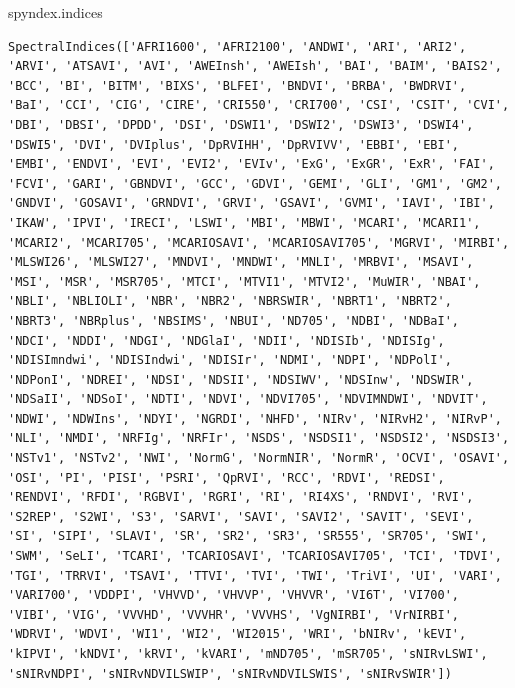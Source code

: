 \documentclass[
]{article}
\newenvironment{Shaded}{}{}
\newcommand{\NormalTok}[1]{#1}
\begin{document}
\label{58bacb5c}
\label{cb5}
\begin{Shaded}
\begin{Highlighting}[]
\NormalTok{spyndex.indices}
\end{Highlighting}
\end{Shaded}

\begin{verbatim}
SpectralIndices(['AFRI1600', 'AFRI2100', 'ANDWI', 'ARI', 'ARI2', 'ARVI', 'ATSAVI', 'AVI', 'AWEInsh', 'AWEIsh', 'BAI', 'BAIM', 'BAIS2', 'BCC', 'BI', 'BITM', 'BIXS', 'BLFEI', 'BNDVI', 'BRBA', 'BWDRVI', 'BaI', 'CCI', 'CIG', 'CIRE', 'CRI550', 'CRI700', 'CSI', 'CSIT', 'CVI', 'DBI', 'DBSI', 'DPDD', 'DSI', 'DSWI1', 'DSWI2', 'DSWI3', 'DSWI4', 'DSWI5', 'DVI', 'DVIplus', 'DpRVIHH', 'DpRVIVV', 'EBBI', 'EBI', 'EMBI', 'ENDVI', 'EVI', 'EVI2', 'EVIv', 'ExG', 'ExGR', 'ExR', 'FAI', 'FCVI', 'GARI', 'GBNDVI', 'GCC', 'GDVI', 'GEMI', 'GLI', 'GM1', 'GM2', 'GNDVI', 'GOSAVI', 'GRNDVI', 'GRVI', 'GSAVI', 'GVMI', 'IAVI', 'IBI', 'IKAW', 'IPVI', 'IRECI', 'LSWI', 'MBI', 'MBWI', 'MCARI', 'MCARI1', 'MCARI2', 'MCARI705', 'MCARIOSAVI', 'MCARIOSAVI705', 'MGRVI', 'MIRBI', 'MLSWI26', 'MLSWI27', 'MNDVI', 'MNDWI', 'MNLI', 'MRBVI', 'MSAVI', 'MSI', 'MSR', 'MSR705', 'MTCI', 'MTVI1', 'MTVI2', 'MuWIR', 'NBAI', 'NBLI', 'NBLIOLI', 'NBR', 'NBR2', 'NBRSWIR', 'NBRT1', 'NBRT2', 'NBRT3', 'NBRplus', 'NBSIMS', 'NBUI', 'ND705', 'NDBI', 'NDBaI', 'NDCI', 'NDDI', 'NDGI', 'NDGlaI', 'NDII', 'NDISIb', 'NDISIg', 'NDISImndwi', 'NDISIndwi', 'NDISIr', 'NDMI', 'NDPI', 'NDPolI', 'NDPonI', 'NDREI', 'NDSI', 'NDSII', 'NDSIWV', 'NDSInw', 'NDSWIR', 'NDSaII', 'NDSoI', 'NDTI', 'NDVI', 'NDVI705', 'NDVIMNDWI', 'NDVIT', 'NDWI', 'NDWIns', 'NDYI', 'NGRDI', 'NHFD', 'NIRv', 'NIRvH2', 'NIRvP', 'NLI', 'NMDI', 'NRFIg', 'NRFIr', 'NSDS', 'NSDSI1', 'NSDSI2', 'NSDSI3', 'NSTv1', 'NSTv2', 'NWI', 'NormG', 'NormNIR', 'NormR', 'OCVI', 'OSAVI', 'OSI', 'PI', 'PISI', 'PSRI', 'QpRVI', 'RCC', 'RDVI', 'REDSI', 'RENDVI', 'RFDI', 'RGBVI', 'RGRI', 'RI', 'RI4XS', 'RNDVI', 'RVI', 'S2REP', 'S2WI', 'S3', 'SARVI', 'SAVI', 'SAVI2', 'SAVIT', 'SEVI', 'SI', 'SIPI', 'SLAVI', 'SR', 'SR2', 'SR3', 'SR555', 'SR705', 'SWI', 'SWM', 'SeLI', 'TCARI', 'TCARIOSAVI', 'TCARIOSAVI705', 'TCI', 'TDVI', 'TGI', 'TRRVI', 'TSAVI', 'TTVI', 'TVI', 'TWI', 'TriVI', 'UI', 'VARI', 'VARI700', 'VDDPI', 'VHVVD', 'VHVVP', 'VHVVR', 'VI6T', 'VI700', 'VIBI', 'VIG', 'VVVHD', 'VVVHR', 'VVVHS', 'VgNIRBI', 'VrNIRBI', 'WDRVI', 'WDVI', 'WI1', 'WI2', 'WI2015', 'WRI', 'bNIRv', 'kEVI', 'kIPVI', 'kNDVI', 'kRVI', 'kVARI', 'mND705', 'mSR705', 'sNIRvLSWI', 'sNIRvNDPI', 'sNIRvNDVILSWIP', 'sNIRvNDVILSWIS', 'sNIRvSWIR'])
\end{verbatim}
\end{document}
